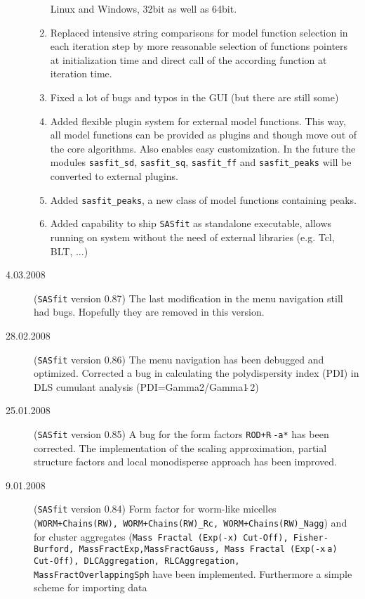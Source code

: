 \begin{description}
\begin{enumerate}
                Linux and Windows, 32bit as well as 64bit.
        \item Replaced intensive string comparisons for model function selection in each iteration step by more reasonable
                selection of functions pointers at initialization time and direct call of the according function at iteration time.
        \item Fixed a lot of bugs and typos in the GUI (but there are still some)
        \item Added flexible plugin system for external model functions. This way, all model functions can be provided
                as plugins and though move out of the core algorithms. Also enables easy customization. In the future
                the modules \texttt{sasfit\_sd}, \texttt{sasfit\_sq}, \texttt{sasfit\_ff} and \texttt{sasfit\_peaks}
                will be converted to external plugins.
        \item Added \texttt{sasfit\_peaks}, a new class of model functions containing peaks.
        \item Added capability to ship {\tt SASfit} as standalone executable, allows running on system without the
                need of external libraries (e.g. Tcl, BLT, ...)
    \end{enumerate}
    \item[4.03.2008] ({\tt SASfit} version 0.87) The last
    modification in the menu navigation still had bugs. Hopefully
    they are removed in this version.
    \item[28.02.2008] ({\tt SASfit} version 0.86)
    The menu navigation has been debugged and optimized.
    Corrected a bug in calculating the polydispersity index (PDI)
    in DLS cumulant analysis (PDI=Gamma2/Gamma1$\hat{~}$2)
    \item[25.01.2008] ({\tt SASfit} version 0.85)
    A bug for the form factors  \texttt{ROD+R$\hat{~}$-a*} has
    been corrected. The implementation of the scaling
    approximation, partial structure factors and local monodisperse
    approach has been improved.
    \item[9.01.2008] ({\tt SASfit} version 0.84) Form factor for
    worm-like micelles (\texttt{WORM+Chains(RW), WORM+Chains(RW)\_Rc,
    WORM+Chains(RW)\_Nagg}) and for cluster aggregates
    (\texttt{Mass Fractal (Exp(-x) Cut-Off), Fisher-Burford,
    MassFractExp,MassFractGauss, Mass Fractal (Exp(-x$\hat{~}$a) Cut-Off), DLCAggregation,
    RLCAggregation, MassFractOverlappingSph} have been implemented. Furthermore a simple scheme for importing data

\end{description}
